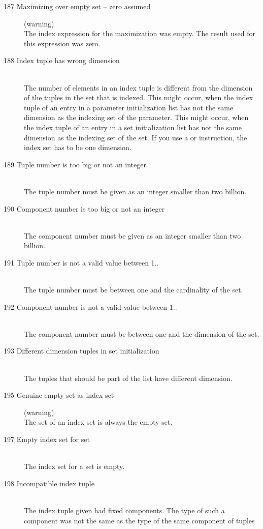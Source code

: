 \begin{description}
\item[187 Maximizing over empty set -- zero assumed] (warning)\ \\
   The index expression for the maximization was empty. The result
   used for this expression was zero.
\item[188 Index tuple has wrong dimension]\ \\
   The number of elements in an index tuple is different from the
   dimension of the tuples in the set that is indexed.
   This might occur, when the index tuple of an entry in a parameter initialization list has
   not the same dimension as the indexing set of the parameter. 
   This might occur, when the index tuple of an entry in a set
   initialization list has
   not the same dimension as the indexing set of the set. 
   If you use a  or  instruction, the index
   set has to be one dimension.
\item[189 Tuple number  is too big or not an integer]\ \\
  The tuple number must be given as an integer smaller than two
  billion.
\item[190 Component number  is too big or not an integer]\ \\
  The component number must be given as an integer smaller than two
  billion.
\item[191 Tuple number  is not a valid value between 1..]\ \\
  The tuple number must be between one and the cardinality of the set.
\item[192 Component number  is not a valid value between 1..]\ \\
  The component number must be between one and the dimension of the set.
\item[193 Different dimension tuples in set initialization]\ \\
  The tuples that should be part of the list have different dimension.
\item[195 Genuine empty set as index set] (warning)\ \\
  The set of an index set is always the empty set.
\item[197 Empty index set for set]\ \\
  The index set for a set is empty.
\item[198 Incompatible index tuple]\ \\
  The index tuple given had fixed components. The type of such a
  component was not the same as the type of the same component of tuples

\end{description}
